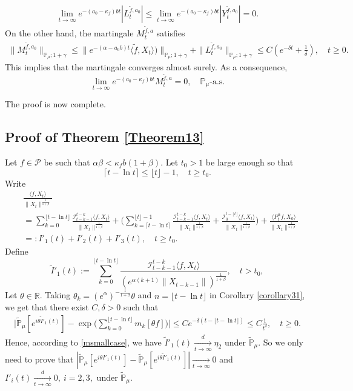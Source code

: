 \documentclass[12pt]{amsart}
\theoremstyle{plain}
\theoremstyle{definition}
\numberwithin{equation}{section}
\begin{document}
\begin{align*}
    \lim_{t\rightarrow \infty}e^{-(a_0 - \kappa_f)bt}|L_t^{\tilde{f},a_0}|
    \leq  \lim_{t\rightarrow \infty}e^{-(a_0 - \kappa_f)bt}|Y_t^{\tilde{f},a_0}|=0.
\end{align*}
	On the other hand, the martingale $M_t^{\tilde{f},a}$ satisfies
\begin{align*}
    \|M_t^{\tilde{f},a_0}\|_{\mathbb{P}_{\mu};1+\gamma}\leq  \|e^{-(\alpha-a_0 b)t}\langle \tilde{f},X_t\rangle)\|_{\mathbb{P}_{\mu};1+\gamma}+\|L_t^{\tilde{f},a_0}\|_{\mathbb{P}_{\mu};1+\gamma}\leq C(e^{-\delta t}+\frac{1}{\delta}),\quad t\geq 0.
\end{align*}
	This implies that the martingale converges almost surely. 
	As a consequence, 
\[
	\lim_{t\rightarrow\infty} e^{-(a_0-\kappa_f)bt}M_t^{\tilde{f},a}
	=0,
	\quad \mathbb P_\mu\text{-a.s.}
\] 
	
	The proof is now complete.

\subsection{Proof of Theorem \ref{Theorem13}}
	Let $f\in \mathcal P$ be such that $\alpha \beta < \kappa_f b(1+\beta)$. 
	Let $t_0 > 1$ be large enough so that 
\[
	\lceil t - \ln t\rceil 
	\leq \lfloor t \rfloor - 1,
	\quad t\geq t_0.
\]
	Write
\begin{align*}
	&\frac{\langle f,X_t\rangle}{\|X_t\|^{\frac{1}{1+\beta}}}
	\\&=\sum_{k=0}^{\lfloor t-\ln t \rfloor} \frac{\mathcal I_{t-k-1}^{t-k}\langle f ,X_t\rangle}{\|X_t\|^{\frac{1}{1+\beta}}}+ \Big(\sum_{k=\lceil t-\ln t \rceil}^{\lfloor t \rfloor-1} \frac{\mathcal I_{t-k-1}^{t-k}\langle f ,X_t\rangle}{\|X_t\|^{\frac{1}{1+\beta}}}+\frac{\mathcal I_0^{t-\lfloor t \rfloor}\langle f ,X_t\rangle}{\|X_t\|^{\frac{1}{1+\beta}}}\Big) + \frac{\langle P_t^\alpha f, X_0\rangle}{\|X_t\|^{\frac{1}{1+\beta}}}
	\\&=:I'_1(t)+I'_2(t)+I'_3(t),
	\quad t\geq t_0.
\end{align*}
	Define
 \[
 	\tilde I'_1(t)
 	:=\sum_{k=0}^{\lfloor t-\ln t \rfloor}\frac{\mathcal I_{t-k-1}^{t-k}\langle f ,X_t\rangle}{( e^{\alpha(k+1)}\|X_{t-k-1}\|)^{\frac{1}{1+\beta}}},
 	\quad t > t_0,
 \]
    Let $\theta\in \mathbb{R}$. 
    Taking $\theta_k=(e^{\alpha})^{-\frac{1}{1+\beta}} \theta $ and $n={\lfloor t-\ln t \rfloor}$ in Corollary \ref{corollary31}, we get that there exist $C,\delta > 0$ such that
\begin{align*}
    \Big|\mathbb{\tilde{P}}_{\mu} [e^{i\theta\tilde I'_1(t)} ]-\exp\Big(\sum_{k=0}^{\lfloor t-\ln t \rfloor}m_k[\theta f]\Big)\Big|
    \leq C e^{-\delta(t - \lfloor t - \ln t\rfloor)}
    \leq C \frac{1}{t^{\delta}},
    \quad t\geq 0.
\end{align*}
    Hence, according to \eqref{msmallcase}, we have $\tilde I'_1(t)\xrightarrow[t\to \infty]{d} \eta_2$ under $\tilde {\mathbb P}_\mu$.
    So we only need to prove that $|\mathbb{\tilde{P}}_{\mu}[e^{i\theta I'_1(t)}]-\mathbb{\tilde{P}}_{\mu}[e^{i\theta\tilde I'_1(t)}]|\xrightarrow[t\to \infty]{} 0$ and $I'_i(t)\xrightarrow[t\to \infty]{d} 0,~i=2,3,$ under $\tilde {\mathbb P}_\mu$.
\end{document}
